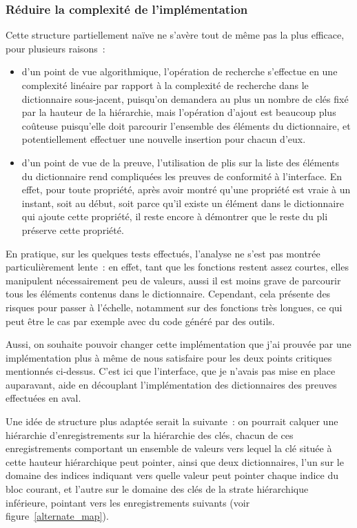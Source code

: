 \documentclass{article}
\begin{document}
\subsubsection{Réduire la complexité de l'implémentation}

Cette structure partiellement naïve ne s'avère tout de même pas la plus
efficace, pour plusieurs raisons~:

\begin{itemize}

\item d'un point de vue algorithmique, l'opération de recherche s'effectue en
une complexité linéaire par rapport à la complexité de recherche dans le
dictionnaire sous-jacent, puisqu'on demandera au plus un nombre de clés fixé
par la hauteur de la hiérarchie, mais l'opération d'ajout est beaucoup plus
coûteuse puisqu'elle doit parcourir l'ensemble des éléments du dictionnaire, et
potentiellement effectuer une nouvelle insertion pour chacun d'eux.

\item d'un point de vue de la preuve, l'utilisation de plis sur la liste des
éléments du dictionnaire rend compliquées les preuves de conformité à
l'interface. En effet, pour toute propriété, après avoir montré qu'une
propriété est vraie à un instant, soit au début, soit parce qu'il existe un
élément dans le dictionnaire qui ajoute cette propriété, il reste encore à
démontrer que le reste du pli préserve cette propriété.

\end{itemize}

En pratique, sur les quelques tests effectués, l'analyse ne s'est pas montrée
particulièrement lente~: en effet, tant que les fonctions restent assez
courtes, elles manipulent nécessairement peu de valeurs, aussi il est moins
grave de parcourir tous les éléments contenus dans le dictionnaire. Cependant,
cela présente des risques pour passer à l'échelle, notamment sur des fonctions
très longues, ce qui peut être le cas par exemple avec du code généré par des
outils.

Aussi, on souhaite pouvoir changer cette implémentation que j'ai prouvée par
une implémentation plus à même de nous satisfaire pour les deux points
critiques mentionnés ci-dessus. C'est ici que l'interface, que je n'avais pas
mise en place auparavant, aide en découplant l'implémentation des dictionnaires
des preuves effectuées en aval.

Une idée de structure plus adaptée serait la suivante~: on pourrait calquer une
hiérarchie d'enregistrements sur la hiérarchie des clés, chacun de ces
enregistrements comportant un ensemble de valeurs vers lequel la clé située à
cette hauteur hiérarchique peut pointer, ainsi que deux dictionnaires, l'un sur
le domaine des indices indiquant vers quelle valeur peut pointer chaque indice
du bloc courant, et l'autre sur le domaine des clés de la strate hiérarchique
inférieure, pointant vers les enregistrements suivants (voir
figure~\ref{alternate_map}).
\end{document}
